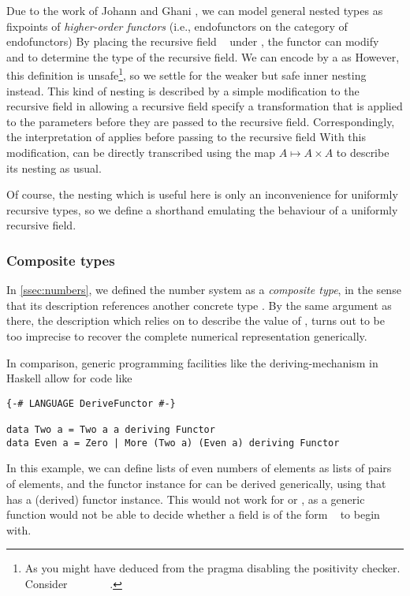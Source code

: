 Due to the work of Johann and Ghani \cite{initenough}, we can model general nested types as fixpoints of \emph{higher-order functors} (i.e., endofunctors on the category of endofunctors)
By placing the recursive field \  under , the functor  can modify \  and  to determine the type of the recursive field. We can encode  by a  as
However, this definition is unsafe\footnote{As you might have deduced from the pragma disabling the positivity checker. Consider \ \ \ \AV{=}\ \ \ \ .}, so we settle for the weaker but safe inner nesting instead. This kind of nesting is described by a simple modification to the recursive field  in 
allowing a recursive field specify a transformation  that is applied to the parameters before they are passed to the recursive field. Correspondingly, the interpretation of  applies  before passing  to the recursive field 
With this modification,  can be directly transcribed 
using the map $A \mapsto A \times A$ to describe its nesting as usual.

Of course, the nesting which is useful here is only an inconvenience for uniformly recursive types, so we define a shorthand
emulating the behaviour of a uniformly recursive field.

\subsubsection{Composite types}
In \autoref{ssec:numbers}, we defined the number system  as a \emph{composite type}, in the sense that its description references another concrete type . By the same argument as there, the description  which relies on  to describe the value of , turns out to be too imprecise to recover the complete numerical representation generically. 

In comparison, generic programming facilities like the deriving-mechanism in Haskell allow for code like
\begin{verbatim}
{-# LANGUAGE DeriveFunctor #-}

data Two a = Two a a deriving Functor
data Even a = Zero | More (Two a) (Even a) deriving Functor    
\end{verbatim}
In this example, we can define lists of even numbers of elements as lists of pairs of elements, and the functor instance for  can be derived generically, using that  has a (derived) functor instance. This would not work for  or , as a generic function would not be able to decide whether a field is of the form \  to begin with. 

